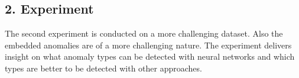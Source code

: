 \subsection{2. Experiment}
The second experiment is conducted on a more challenging dataset. Also the embedded anomalies are of a more challenging nature. The experiment delivers insight on what anomaly types can be detected with neural networks and which types are better to be detected with other approaches.





 